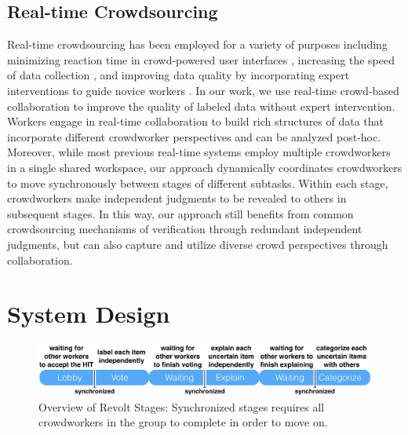 

\subsection{Real-time Crowdsourcing}
Real-time crowdsourcing has been employed for a variety of purposes including minimizing reaction time in crowd-powered user interfaces \cite{bigham2010vizwiz,Bernstein:2011:CTS:2047196.2047201,Burton:2012:CSF:2384916.2384941,laput2015zensors,lasecki2013chorus}, increasing the speed of data collection \cite{lasecki2014glance,Krishna:2016:EEE:2858036.2858115}, and improving data quality by incorporating expert interventions to guide novice workers \cite{chan2016improving,dow2012shepherding,kim2014ensemble}.
In our work, we use real-time crowd-based collaboration to improve the quality of labeled data without expert intervention. Workers engage in real-time collaboration to build rich structures of data that incorporate different crowdworker perspectives and can be analyzed post-hoc. Moreover, while most previous real-time systems employ multiple crowdworkers in a single shared workspace, our approach dynamically coordinates crowdworkers to move synchronously between stages of different subtasks. Within each stage, crowdworkers make independent judgments to be revealed to others in subsequent stages. In this way, our approach still benefits from common crowdsourcing mechanisms of verification through redundant independent judgments, but can also capture and utilize diverse crowd perspectives through collaboration. 


\section{System Design}

\begin{figure}[ht]
	\centering
	\includegraphics[width=0.9\columnwidth]{Chapters/Revolt/figures/overview3.png}
	\caption[Overview of Revolt stages.]{
	Overview of Revolt Stages: Synchronized stages requires all crowdworkers in the group to complete in order to move on. 
	}
	\label{fig:overview}
\end{figure}

